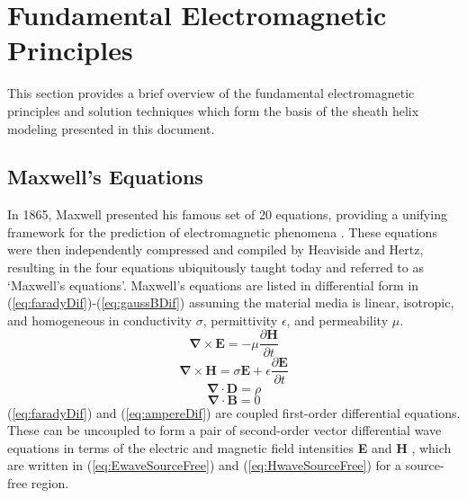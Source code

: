\section{Fundamental Electromagnetic Principles}\label{sec:electromagnetism}
This section provides a brief overview of the fundamental electromagnetic principles and solution techniques which form the basis of the sheath helix modeling presented in this document.

\subsection{Maxwell's Equations}\label{subsec:maxwell}
In 1865, Maxwell presented his famous set of 20 equations, providing a unifying framework for the prediction of electromagnetic phenomena \cite{maxwell1}. These equations were then independently compressed and compiled by Heaviside and Hertz, resulting in the four equations ubiquitously taught today and referred to as `Maxwell's equations'. Maxwell's equations are listed in differential form in (\ref{eq:faradyDif})-(\ref{eq:gaussBDif}) assuming the material media is linear, isotropic, and homogeneous in conductivity $\sigma$, permittivity $\epsilon$, and permeability $\mu$.
\begin{equation}\label{eq:faradyDif}
	\mathbf{\nabla} \times \mathbf{E} = -\mu \frac{\partial \mathbf{H}}{\partial t} 
\end{equation}
\begin{equation}\label{eq:ampereDif}
	\mathbf{\nabla} \times \mathbf{H} = \sigma\mathbf{E} + \epsilon \frac{\partial \mathbf{E}}{\partial t} 
\end{equation}
\begin{equation}\label{eq:gaussEDif}
	\mathbf{\nabla} \cdot \mathbf{D} = \rho 
\end{equation}
\begin{equation}\label{eq:gaussBDif}
	\mathbf{\nabla} \cdot \mathbf{B} = 0
\end{equation}
(\ref{eq:faradyDif}) and (\ref{eq:ampereDif}) are coupled first-order differential equations. These can be uncoupled to form a pair of second-order vector differential wave equations in terms of the electric and magnetic field intensities \textbf{E} and \textbf{H} \cite{balanis1}, which are written in (\ref{eq:EwaveSourceFree}) and (\ref{eq:HwaveSourceFree}) for a source-free region.

